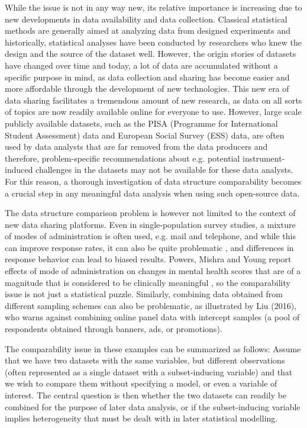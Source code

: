 \documentclass[a4paper,14pt]{article}
\begin{document}
While the issue is not in any way new, its relative importance is increasing due to new developments in data availability and data collection. Classical statistical methods are generally aimed at analyzing data from designed experiments and historically, statistical analyses have been conducted by researchers who knew the design and the source of the dataset well. However, the origin stories of datasets have changed over time and today, a lot of data are accumulated without a specific purpose in mind, as data collection and sharing has become easier and more affordable through the development of new technologies. This new era of data sharing facilitates a tremendous amount of new research, as data on all sorts of topics are now readily available online for everyone to use. However, large scale publicly available datasets, such as the PISA (Programme for International Student Assessment) data and European Social Survey (ESS) data, are often used by data analysts that are far removed from the data producers and therefore, problem-specific recommendations about e.g. potential instrument-induced challenges in the datasets may not be available for these data analysts. For this reason, a thorough investigation of data structure comparability becomes a crucial step in any meaningful data analysis when using such open-source data.

The data structure comparison problem is however not limited to the context of new data sharing platforms. Even in single-population survey studies, a mixture of modes of administration is often used, e.g. mail and telephone, and while this can improve response rates, it can also be quite problematic \cite{Brambilla1987,McHorney1994}, and differences in response behavior can lead to biased results. Powers, Mishra and Young report effects of mode of administration on changes in mental health scores that are of a magnitude that is considered to be clinically meaningful \cite{Powers2005}, so the comparability issue is not just a statistical puzzle. Similarly, combining data obtained from different sampling schemes can also be problematic, as illustrated by Liu (2016), who warns against combining online panel data with intercept samples (a pool of respondents obtained through banners, ads, or promotions).\nocite{Liu2016}

The comparability issue in these examples can be summarized as follows: Assume that we have two datasets with the same variables, but different observations (often represented as a single dataset with a subset-inducing variable) and that we wish to compare them without specifying a model, or even a variable of interest. The central question is then whether the two datasets can readily be combined for the purpose of later data analysis, or if the subset-inducing variable implies heterogeneity that must be dealt with in later statistical modelling.
\end{document}
